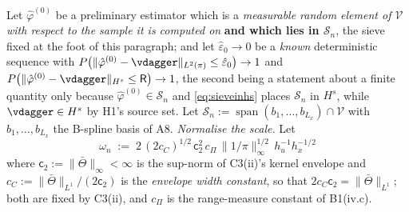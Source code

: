 \begin{definition}\label{def:lfstep}
Let $\hat\varphi^{(0)}$ be a preliminary estimator which is a \emph{measurable random element of
$\mathcal V$ with respect to the sample it is computed on} \textbf{and which lies in $\mathcal S_n$}, the
sieve fixed at the foot of this paragraph; and let $\hat\varepsilon_0\to0$ be a \emph{known}
deterministic sequence with
$P\big(\|\hat\varphi^{(0)}-\vdagger\|_{L^{2}(\pi)}\le\hat\varepsilon_0\big)\to1$ and
$P\big(\|\hat\varphi^{(0)}-\vdagger\|_{H^{s}}\le\mathsf R\big)\to1$, the second being a statement about
a finite quantity only because $\hat\varphi^{(0)}\in\mathcal S_n$ and \eqref{eq:sieveinhs} places
$\mathcal S_n$ in $H^{s}$, while $\vdagger\in H^{s}$ by H1's source set.
Let
$\mathcal S_n:=\operatorname{span}(b_1,\dots,b_{L_x})\cap\mathcal V$ with $b_1,\dots,b_{L_x}$
the B-spline basis of A8. \emph{Normalise the scale.} Let
\begin{equation}\label{eq:normconst}
\omega_n\;:=\;2\,(2c_C)^{1/2}\,\mathsf c_2^{2}\,c_\Pi\,\|1/\pi\|_\infty^{1/2}\,h_u^{-1}h_x^{-1/2}
\end{equation}
where $\mathsf c_2:=\|\bar\Theta\|_\infty<\infty$ is the sup-norm of C3(ii)'s kernel envelope and
$c_C:=\|\bar\Theta\|_{L^{1}}/(2\mathsf c_2)$ is the \emph{envelope width constant}, so that
$2c_C\mathsf c_2=\|\bar\Theta\|_{L^{1}}$; both are fixed by C3(ii), and $c_\Pi$ is the range-measure
constant of B1(iv.c).

\end{definition}
